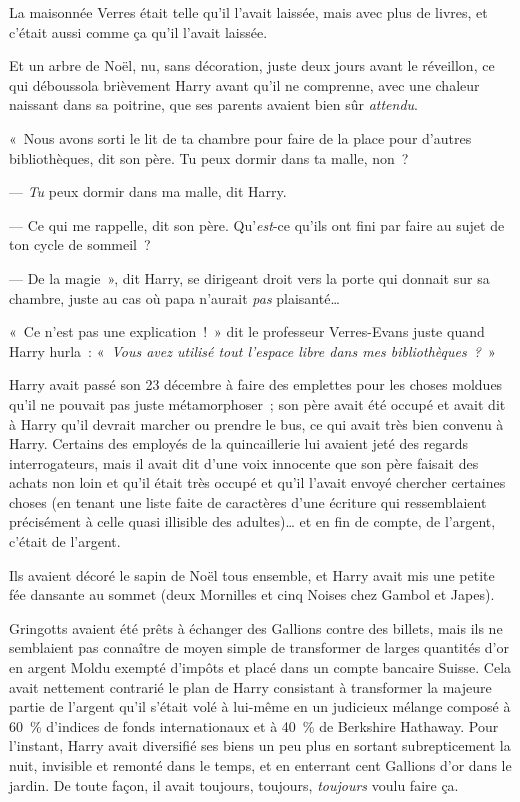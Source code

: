 La maisonnée Verres était telle qu'il l'avait laissée, mais avec plus de livres, et c'était aussi comme ça qu'il l'avait laissée.

Et un arbre de Noël, nu, sans décoration, juste deux jours avant le réveillon, ce qui déboussola brièvement Harry avant qu'il ne comprenne, avec une chaleur naissant dans sa poitrine, que ses parents avaient bien sûr \emph{attendu}.

«~Nous avons sorti le lit de ta chambre pour faire de la place pour d'autres bibliothèques, dit son père. Tu peux dormir dans ta malle, non~?

--- \emph{Tu} peux dormir dans ma malle, dit Harry.

--- Ce qui me rappelle, dit son père. Qu'\emph{est}-ce qu'ils ont fini par faire au sujet de ton cycle de sommeil~?

--- De la magie~», dit Harry, se dirigeant droit vers la porte qui donnait sur sa chambre, juste au cas où papa n'aurait \emph{pas} plaisanté…

«~Ce n'est pas une explication~!~» dit le professeur Verres-Evans juste quand Harry hurla~: «~\emph{Vous avez utilisé tout l'espace libre dans mes bibliothèques~?}~»

\later

Harry avait passé son 23 décembre à faire des emplettes pour les choses moldues qu'il ne pouvait pas juste métamorphoser~; son père avait été occupé et avait dit à Harry qu'il devrait marcher ou prendre le bus, ce qui avait très bien convenu à Harry. Certains des employés de la quincaillerie lui avaient jeté des regards interrogateurs, mais il avait dit d'une voix innocente que son père faisait des achats non loin et qu'il était très occupé et qu'il l'avait envoyé chercher certaines choses (en tenant une liste faite de caractères d'une écriture qui ressemblaient précisément à celle quasi illisible des adultes)… et en fin de compte, de l'argent, c'était de l'argent.

Ils avaient décoré le sapin de Noël tous ensemble, et Harry avait mis une petite fée dansante au sommet (deux Mornilles et cinq Noises chez Gambol et Japes).

Gringotts avaient été prêts à échanger des Gallions contre des billets, mais ils ne semblaient pas connaître de moyen simple de transformer de larges quantités d'or en argent Moldu exempté d'impôts et placé dans un compte bancaire Suisse. Cela avait nettement contrarié le plan de Harry consistant à transformer la majeure partie de l'argent qu'il s'était volé à lui-même en un judicieux mélange composé à 60~\% d'indices de fonds internationaux et à 40~\% de Berkshire Hathaway. Pour l'instant, Harry avait diversifié ses biens un peu plus en sortant subrepticement la nuit, invisible et remonté dans le temps, et en enterrant cent Gallions d'or dans le jardin. De toute façon, il avait toujours, toujours, \emph{toujours} voulu faire ça.


